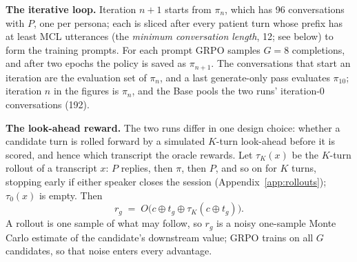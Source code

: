 \textbf{The iterative loop.} Iteration $n{+}1$ starts from $\pi_n$, which has 96 conversations with
$P$, one per persona; each is sliced after every patient turn whose prefix has at least MCL
utterances (the \emph{minimum conversation length}, 12; see below) to form the training prompts.
For each prompt GRPO samples $G{=}8$ completions, and after two epochs the policy is saved as
$\pi_{n+1}$.
The conversations that start an iteration are the evaluation set of
$\pi_n$, and a last generate-only pass evaluates $\pi_{10}$; iteration $n$ in the figures is
$\pi_n$, and the Base pools the two runs' iteration-0 conversations (192).

\textbf{The look-ahead reward.}
The two runs differ in one design choice: whether a candidate turn is
rolled forward by a simulated $K$-turn look-ahead before it is scored, and hence which transcript
the oracle rewards. Let $\tau_K(x)$ be the $K$-turn rollout of a transcript $x$: $P$ replies, then
$\pi$, then $P$, and so on for $K$ turns, stopping early if either speaker closes the session
(Appendix~\ref{app:rollouts}); $\tau_0(x)$ is empty. Then
\begin{equation}
\label{eq:reward}
r_g \;=\; O\big(c \oplus t_g \oplus \tau_K(c \oplus t_g)\big).
\end{equation}
A rollout is one sample of what may follow, so $r_g$ is a noisy one-sample Monte Carlo estimate of
the candidate's downstream value; GRPO trains on all $G$ candidates, so that noise enters every
advantage.

